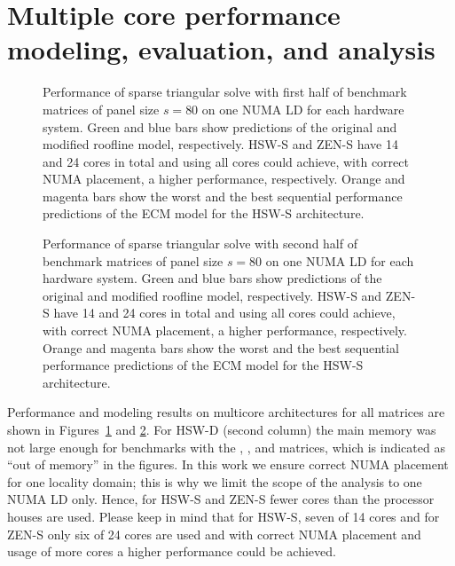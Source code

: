 \newpage

\section{Multiple core performance modeling, evaluation, and analysis}
\label{sec:performance:multicore}

\begin{figure}[tp]%
  \centering%
  \begin{adjustbox}{angle=90}
  \end{adjustbox}
  \caption{Performance of sparse triangular solve with first half of benchmark matrices of
panel size $s=80$ on one NUMA LD for each hardware system.
  Green and blue bars show predictions of the original and modified roofline
model, respectively.
  HSW-S and ZEN-S have 14 and 24 cores in total and using all cores could
achieve, with correct NUMA placement, a higher performance, respectively.
  Orange and magenta bars show the worst and the best sequential performance predictions of the ECM model for the HSW-S architecture.}
  \label{fig:p:pardiso-1}
\end{figure}

\begin{figure}[tp]%
  \centering%
  \begin{adjustbox}{angle=90}
  \end{adjustbox}
  \caption{Performance of sparse triangular solve with second half of benchmark matrices of
panel size $s=80$ on one NUMA LD for each hardware system.
  Green and blue bars show predictions of the original and modified roofline
model, respectively.
  HSW-S and ZEN-S have 14 and 24 cores in total and using all cores could
achieve, with correct NUMA placement, a higher performance, respectively.
  Orange and magenta bars show the worst and the best sequential performance predictions of the ECM model for the HSW-S architecture.}
  \label{fig:p:pardiso-2}
\end{figure}

Performance and modeling results on multicore architectures for all matrices are shown in Figures~\ref{fig:p:pardiso-1} and \ref{fig:p:pardiso-2}.
For HSW-D (second column) the main memory was not large enough for benchmarks
with the , , and  matrices, which is
indicated as ``out of memory'' in the figures.
%
%
In this work we ensure correct NUMA placement for one locality domain; this is why
we limit the scope of the analysis to one NUMA LD only. 
Hence, for HSW-S and ZEN-S fewer cores than the processor houses are used.
Please keep in mind that for HSW-S, seven of 14 cores and for ZEN-S only six of
24 cores are used and with correct NUMA placement and usage of more cores a
higher performance could be achieved.

